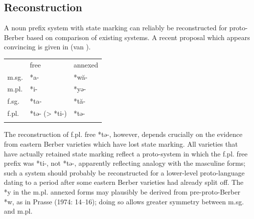 \documentclass[output=paper]{langscibook}
\begin{document}
\subsection{Reconstruction} %
\begin{styleStandarduser}
A noun prefix system with state marking can reliably be reconstructed for proto-Berber based on comparison of existing systems. A recent proposal which appears convincing is given in  (van \citealt{Putten2015}).
\end{styleStandarduser}

\begin{styleLangsciTableHeading}%
\begin{table}
\caption{Proto-Berber nominal prefixes.}
\label{tab:key:9}
\end{table}\end{styleLangsciTableHeading}


\begin{tabularx}{\textwidth}{XXX}
 & free & annexed\\
\lsptoprule
m.sg. & *a- & *wă-\\
m.pl. & *i- & *yə-\\
f.sg. & *ta- & *tă-\\
f.pl. & *tə- (> *ti-) & *tə-\\
\lspbottomrule
\end{tabularx}
\begin{styleStandarduser}
The reconstruction of f.pl. free *tə-, however, depends crucially on the evidence from eastern Berber varieties which have lost state marking. All varieties that have actually retained state marking reflect a proto-system in which the f.pl. free prefix was *ti-, not *tə-, apparently reflecting analogy with the masculine forms; such a system should probably be reconstructed for a lower-level proto-language dating to a period after some eastern Berber varieties had already split off. The *y in the m.pl. annexed forms may plausibly be derived from pre-proto-Berber *w, as in Prasse (1974: 14–16); doing so allows greater symmetry between m.sg. and m.pl.
\end{styleStandarduser}
\end{document}
